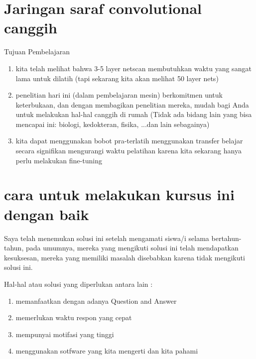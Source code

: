 \section{Jaringan saraf convolutional canggih}
Tujuan Pembelajaran
\begin{enumerate}

\item  kita telah melihat bahwa 3-5 layer netscan membutuhkan waktu yang sangat lama untuk dilatih
(tapi sekarang kita akan melihat 50 layer nets)
\item penelitian hari ini (dalam pembelajaran mesin) berkomitmen untuk keterbukaan, dan dengan membagikan penelitian mereka, mudah bagi Anda untuk melakukan hal-hal canggih di rumah
(Tidak ada bidang lain yang bisa mencapai ini: biologi, kedokteran, fisika, ...dan lain sebagainya)
\item kita dapat menggunakan bobot pra-terlatih menggunakan transfer belajar secara signifikan mengurangi waktu pelatihan karena kita sekarang hanya perlu melakukan fine-tuning
\end{enumerate}

\section{cara untuk melakukan kursus ini dengan baik}
Saya telah menemukan solusi ini setelah mengamati siswa/i selama bertahun-tahun,
pada umumnya, mereka yang mengikuti solusi ini telah mendapatkan kesuksesan, mereka yang memiliki masalah disebabkan karena tidak mengikuti solusi ini.

Hal-hal atau solusi yang diperlukan antara lain :
\begin{enumerate}
\item memanfaatkan dengan adanya Question and Answer  
\item memerlukan waktu respon yang cepat
\item mempunyai motifasi yang tinggi
\item menggunakan sotfware yang kita mengerti dan kita pahami 
\end {enumerate}

